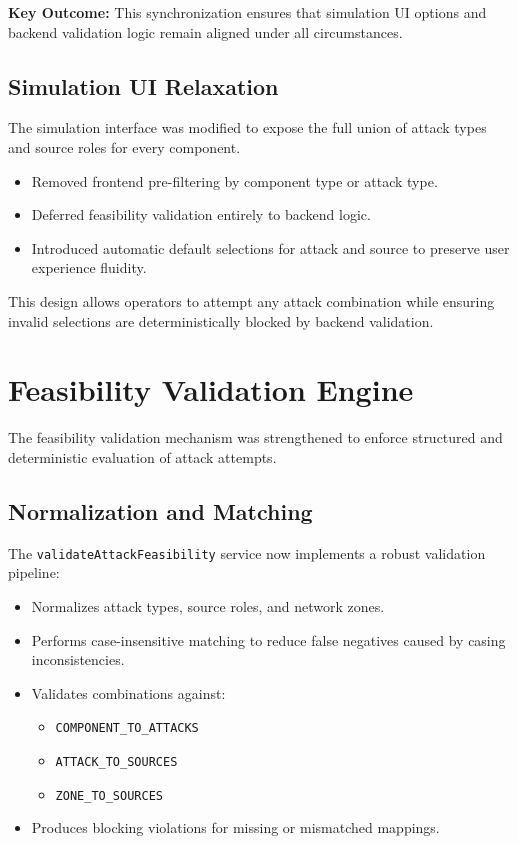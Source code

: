 \documentclass[12pt]{article}
\begin{document}
\begin{tcolorbox}[colback=lightgray, colframe=accent, boxrule=1pt, arc=3pt, left=8pt, right=8pt]
\textbf{\color{accent}Key Outcome:} This synchronization ensures that simulation UI options and backend validation logic remain aligned under all circumstances.
\end{tcolorbox}

\subsection{Simulation UI Relaxation}

The simulation interface was modified to expose the full union of attack types and source roles for every component.

\begin{itemize}[leftmargin=1.5em]
\item Removed frontend pre-filtering by component type or attack type.
\item Deferred feasibility validation entirely to backend logic.
\item Introduced automatic default selections for attack and source to preserve user experience fluidity.
\end{itemize}

This design allows operators to attempt any attack combination while ensuring invalid selections are deterministically blocked by backend validation.

\section{Feasibility Validation Engine}

The feasibility validation mechanism was strengthened to enforce structured and deterministic evaluation of attack attempts.

\subsection{Normalization and Matching}

The \texttt{validateAttackFeasibility} service now implements a robust validation pipeline:

\begin{itemize}[leftmargin=1.5em]
\item Normalizes attack types, source roles, and network zones.
\item Performs case-insensitive matching to reduce false negatives caused by casing inconsistencies.
\item Validates combinations against:
  \begin{itemize}
  \item \texttt{COMPONENT\_TO\_ATTACKS}
  \item \texttt{ATTACK\_TO\_SOURCES}
  \item \texttt{ZONE\_TO\_SOURCES}
  \end{itemize}
\item Produces blocking violations for missing or mismatched mappings.
\end{itemize}
\end{document}
